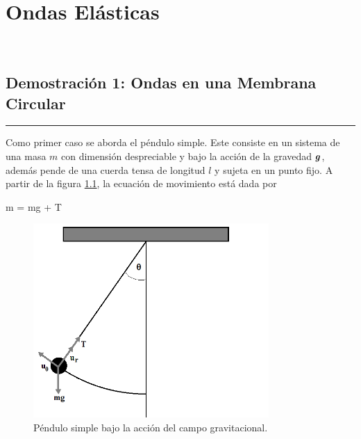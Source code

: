 \chapter{Ondas Elásticas}
\label{cha:waves}





\
\section{Demostración 1: Ondas en una Membrana Circular}
\label{sec:DEMO3_01}
\rule{14cm}{0.5mm}

Como primer caso se aborda el péndulo simple. Este consiste en un sistema
de una masa $m$ con dimensión despreciable y bajo la acción de la 
gravedad $\boldsymbol{ g }$, además pende de una cuerda tensa de longitud $l$ y sujeta
en un punto fijo. A partir de la figura \ref{fig:simple_pendulum}, la 
ecuación de movimiento está dada por


{m = m\bds g + \bds T}

\newpage
\begin{figure}[htbp]
	\centering
	\includegraphics[width=0.80\textwidth]
	{./pictures/simple_pendulum.png}

	\caption{\small{Péndulo simple bajo la acción del campo gravitacional.}}
	
	\label{fig:simple_pendulum}
\end{figure}


